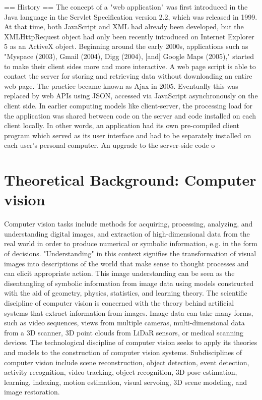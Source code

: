 \documentclass[12pt,a4paper]{report}
\begin{document}
== History ==
The concept of a "web application" was first introduced in the Java language in the Servlet Specification version 2.2, which was released in 1999. At that time, both JavaScript and XML had already been developed, but the XMLHttpRequest object had only been recently introduced on Internet Explorer 5 as an ActiveX object. Beginning around the early 2000s, applications such as "Myspace (2003), Gmail (2004), Digg (2004), [and] Google Maps (2005)," started to make their client sides more and more interactive. A web page script is able to contact the server for storing and retrieving data without downloading an entire web page. The practice became known as Ajax in 2005. Eventually this was replaced by web APIs using JSON, accessed via JavaScript asynchronously on the client side.
In earlier computing models like client-server, the processing load for the application was shared between code on the server and code installed on each client locally. In other words, an application had its own pre-compiled client program which served as its user interface and had to be separately installed on each user's personal computer. An upgrade to the server-side code o

\section{Theoretical Background: Computer vision}
Computer vision tasks include methods for acquiring, processing, analyzing, and understanding digital images, and extraction of high-dimensional data from the real world in order to produce numerical or symbolic information, e.g. in the form of decisions. "Understanding" in this context signifies the transformation of visual images into descriptions of the world that make sense to thought processes and can elicit appropriate action. This image understanding can be seen as the disentangling of symbolic information from image data using models constructed with the aid of geometry, physics, statistics, and learning theory.
The scientific discipline of computer vision is concerned with the theory behind artificial systems that extract information from images. Image data can take many forms, such as video sequences, views from multiple cameras, multi-dimensional data from a 3D scanner, 3D point clouds from LiDaR sensors, or medical scanning devices. The technological discipline of computer vision seeks to apply its theories and models to the construction of computer vision systems.
Subdisciplines of computer vision include scene reconstruction, object detection, event detection, activity recognition, video tracking, object recognition, 3D pose estimation, learning, indexing, motion estimation, visual servoing, 3D scene modeling, and image restoration.
\end{document}
